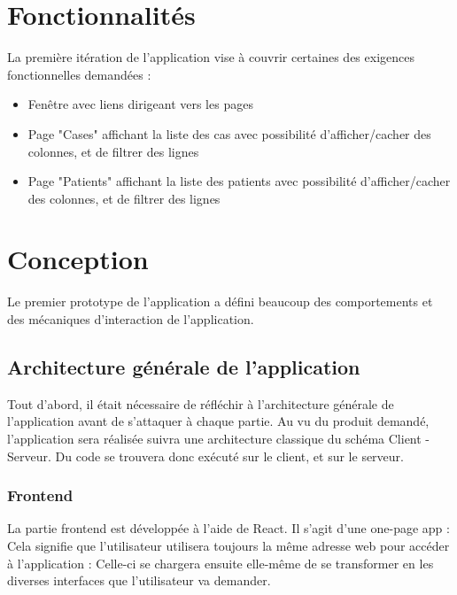 
\section{Fonctionnalités}

	La première itération de l'application vise à couvrir certaines des exigences fonctionnelles demandées :
	\begin{itemize}
		\item Fenêtre avec liens dirigeant vers les pages
		\item Page "Cases" affichant la liste des cas avec possibilité d'afficher/cacher des colonnes, et de filtrer des lignes
		\item Page "Patients" affichant la liste des patients avec possibilité d'afficher/cacher des colonnes, et de filtrer des lignes
	\end{itemize}

\section{Conception}

	Le premier prototype de l'application a défini beaucoup des comportements et des mécaniques d'interaction de l'application.

	\subsection{Architecture générale de l'application}

		Tout d'abord, il était nécessaire de réfléchir à l'architecture générale de l'application avant de s'attaquer à chaque partie. Au vu du produit demandé, l'application sera réalisée suivra une architecture classique du schéma Client - Serveur. Du code se trouvera donc exécuté sur le client, et sur le serveur.

	\subsubsection{Frontend}

		La partie frontend est développée à l'aide de React. Il s'agit d'une one-page app : Cela signifie que l'utilisateur utilisera toujours la même adresse web pour accéder à l'application : Celle-ci se chargera ensuite elle-même de se transformer en les diverses interfaces que l'utilisateur va demander.

